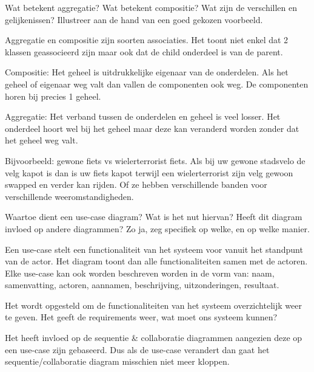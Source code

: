 \begin{solution}[print]

\end{solution}

\begin{question}
Wat betekent aggregatie? Wat betekent compositie? Wat zijn de verschillen en gelijkenissen? Illustreer aan de hand van een goed gekozen voorbeeld.
\end{question}

\begin{solution}[print]

Aggregatie en compositie zijn soorten associaties. Het toont niet enkel dat 2 klassen geassocieerd zijn maar ook dat de child onderdeel is van de parent.

Compositie: Het geheel is uitdrukkelijke eigenaar van de onderdelen. Als het geheel of eigenaar weg valt dan vallen de componenten ook weg. De componenten horen bij precies 1 geheel.

Aggregatie: Het verband tussen de onderdelen en geheel is veel losser. Het onderdeel hoort wel bij het geheel maar deze kan veranderd worden zonder dat het geheel weg valt.

Bijvoorbeeld: gewone fiets vs wielerterrorist fiets. Als bij uw gewone stadsvelo de velg kapot is dan is uw fiets kapot terwijl een wielerterrorist zijn velg gewoon swapped en verder kan rijden. Of ze hebben verschillende banden voor verschillende weeromstandigheden.


\end{solution}

\begin{question}
 Waartoe dient een use-case diagram? Wat is het nut hiervan? Heeft dit diagram invloed op andere diagrammen? Zo ja, zeg specifiek op welke, en op welke manier.
\end{question}

\begin{solution}[print]

Een use-case stelt een functionaliteit van het systeem voor vanuit het standpunt van de actor. Het diagram toont dan alle functionaliteiten samen met de actoren. Elke use-case kan ook worden beschreven worden in de vorm van: naam, samenvatting, actoren, aannamen, beschrijving, uitzonderingen, resultaat.

Het wordt opgesteld om de functionaliteiten van het systeem overzichtelijk weer te geven. Het geeft de requirements weer, wat moet ons systeem kunnen?

Het heeft invloed op de sequentie \& collaboratie diagrammen aangezien deze op een use-case zijn gebaseerd. Dus als de use-case verandert dan gaat het sequentie/collaboratie diagram misschien niet meer kloppen.

\end{solution}

